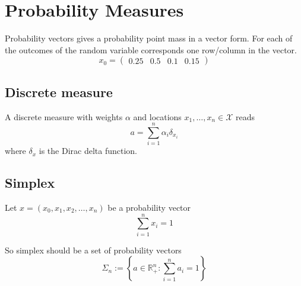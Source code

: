 \section{Probability Measures}

Probability vectors gives a probability point mass in a vector form.
For each of the outcomes of the random variable corresponds one row/column in the vector.
$$
x_{0} = \begin{pmatrix}
0.25 & 0.5 & 0.1 & 0.15
\end{pmatrix}
$$



\subsection{Discrete measure}

\begin{definition}
A discrete measure with weights $\alpha$ and locations $x_{1}, \dots, x_{n} \in \mathcal{X}$ reads
$$
a = \sum_{i=1}^{n} \alpha_{i} \delta_{x_{i}}
$$
where $\delta_{x}$ is the Dirac delta function.
\end{definition}


\subsection{Simplex}

Let $x = (x_{0}, x_{1}, x_{2}, \dots, x_{n})$ be a probability vector
$$
\sum_{i=1}^{n} x_{i} = 1
$$

So simplex should be a set of probability vectors
$$
\Sigma_{n} := \left\{ a \in \mathbb{R}_{+}^{n} : \sum_{i=1}^{n} a_{i} = 1 \right\}
$$
